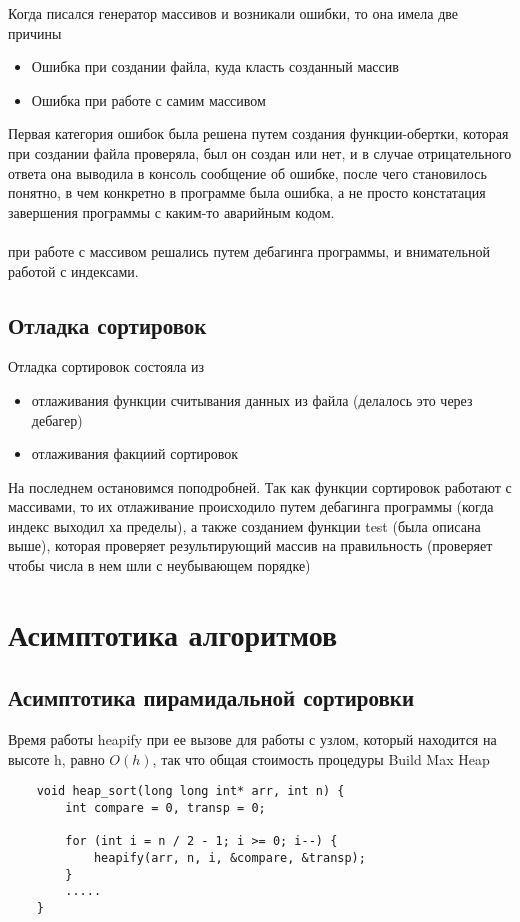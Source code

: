 \documentclass[a4paper,12pt,titlepage,finall]{article}
\begin{document}
Когда писался генератор массивов и возникали ошибки, то она имела две причины
\begin{itemize}
    \item Ошибка при создании файла, куда класть созданный массив
    \item Ошибка при работе с самим массивом
\end{itemize}

Первая категория ошибок была решена путем создания функции-обертки, которая
при создании файла проверяла, был он создан или нет, и в случае отрицательного ответа она
выводила в консоль сообщение об ошибке, после чего становилось понятно, в чем конкретно 
в программе была ошибка, а не просто констатация завершения программы с каким-то аварийным кодом.
\\
\\
 при работе с массивом решались путем дебагинга программы,
и внимательной работой с индексами.

\subsection{Отладка сортировок}

Отладка сортировок состояла из 
\begin{itemize}
    \item отлаживания функции считывания данных из файла (делалось это через дебагер)
    \item отлаживания факциий сортировок
\end{itemize}

На последнем остановимся поподробней. Так как функции сортировок работают с массивами, то
их отлаживание происходило путем дебагинга программы (когда индекс выходил ха пределы),
а также созданием функции test (была описана выше), которая проверяет результирующий массив на 
правильность (проверяет чтобы числа в нем шли с неубывающем порядке)


\newpage

\section{Асимптотика алгоритмов}

\subsection{Асимптотика пирамидальной сортировки}

Время работы heapify при ее вызове для работы с узлом, который находится на высоте h,
равно $O(h)$, так что общая стоимость процедуры Build Max Heap
\begin{verbatim}
    void heap_sort(long long int* arr, int n) {
        int compare = 0, transp = 0;
    
        for (int i = n / 2 - 1; i >= 0; i--) {
            heapify(arr, n, i, &compare, &transp);
        }
        .....
    }
\end{verbatim}
\end{document}
